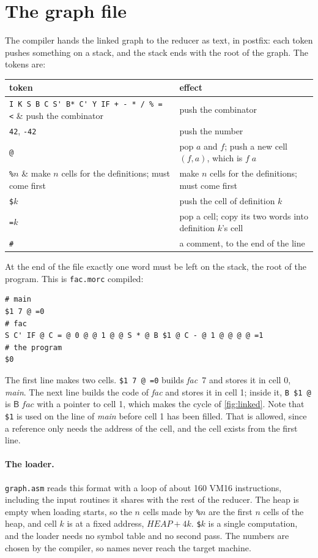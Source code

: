 \documentclass[11pt,a4paper]{article}
\newcommand{\cmb}[1]{\textsf{#1}}
\newcommand{\B}{\cmb{B}}
\theoremstyle{definition}
\theoremstyle{plain}
\begin{document}
\section{The graph file}\label{sec:format}

The compiler hands the linked graph to the reducer as text, in postfix: each
token pushes something on a stack, and the stack ends with the root of the
graph. The tokens are:

\begin{center}
\small
\begin{tabular}{@{}l l@{}}
\toprule
token & effect\\
\midrule
\verb|I K S B C S' B* C' Y IF + - * / % = <| & push the combinator\\
\verb|42|, \verb|-42| & push the number\\
\verb|@| & pop $a$ and $f$; push a new cell $(f, a)$, which is $f\;a$\\
\verb|%|$n$ & make $n$ cells for the definitions; must come first\\
\verb|$|$k$ & push the cell of definition $k$\\
\verb|=|$k$ & pop a cell; copy its two words into definition $k$'s cell\\
\verb|#| & a comment, to the end of the line\\
\bottomrule
\end{tabular}
\end{center}

\noindent
At the end of the file exactly one word must be left on the stack, the root
of the program. This is \texttt{fac.morc} compiled:
\begin{lstlisting}[style=plain]
%2
# main
$1 7 @ =0
# fac
S C' IF @ C = @ 0 @ @ 1 @ @ S * @ B $1 @ C - @ 1 @ @ @ @ =1
# the program
$0
\end{lstlisting}
The first line makes two cells. \verb|$1 7 @ =0| builds \textit{fac}~7 and
stores it in cell 0, \textit{main}. The next line builds the code of
\textit{fac} and stores it in cell 1; inside it, \verb|B $1 @| is
$\B\;\mathit{fac}$ with a pointer to cell 1, which makes the cycle of
\cref{fig:linked}. Note that \verb|$1| is used on the line of \textit{main}
before cell 1 has been filled. That is allowed, since a reference only needs
the address of the cell, and the cell exists from the first line.

\paragraph{The loader.} \texttt{graph.asm} reads this format with a loop
of about 160 VM16 instructions, including the input routines it shares with
the rest of the reducer. The heap is empty when loading starts, so the $n$
cells made by \verb|%|$n$ are the first $n$ cells of the heap, and cell $k$
is at a fixed address, $\mathit{HEAP} + 4k$. \verb|$|$k$ is a single
computation, and the loader needs no symbol table and no second pass. The
numbers are chosen by the compiler, so names never reach the target machine.
\end{document}
